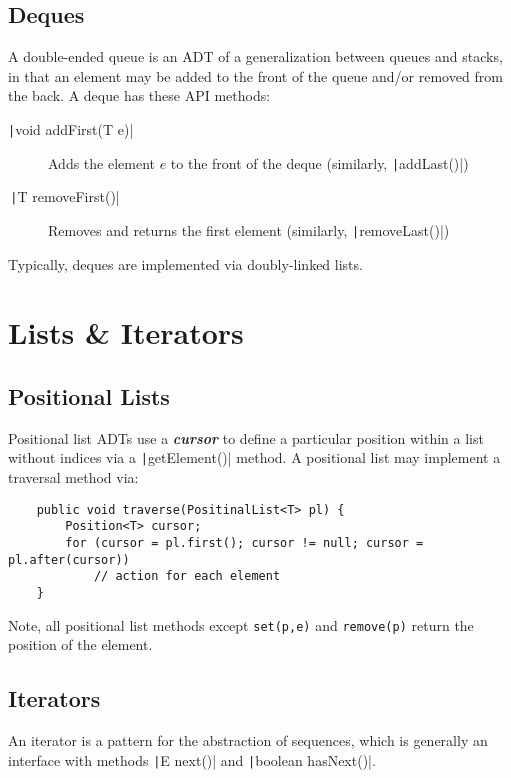 \documentclass[12pt, letterpaper]{article}
\begin{document}
\subsection{Deques }
A double-ended queue is an ADT of a generalization between queues and stacks, in that an element may be added to the front of the queue and/or removed from the back. A deque has these API methods:
\begin{description}
    \item[\texttt|void addFirst(T e)|] Adds the element $e$ to the front of the deque (similarly, \texttt|addLast()|)
    \item[\quad\,\;\texttt|T removeFirst()|] Removes and returns the first element (similarly, \texttt|removeLast()|)
\end{description}
Typically, deques are implemented via doubly-linked lists.

\newpage

\section{Lists \& Iterators}

\subsection{Positional Lists }
Positional list ADTs use a \textbf{\textit{cursor}} to define a particular position within a list without indices via a \texttt|getElement()| method. A positional list may implement a traversal method via:
\begin{verbatim}
    public void traverse(PositinalList<T> pl) {
        Position<T> cursor;
        for (cursor = pl.first(); cursor != null; cursor = pl.after(cursor))
            // action for each element
    }
\end{verbatim}
Note, all positional list methods except \verb|set(p,e)| and \verb|remove(p)| return the position of the element.

\subsection{Iterators}
An iterator is a pattern for the abstraction of sequences, which is generally an interface with methods \texttt|E next()| and \texttt|boolean hasNext()|.
\end{document}
